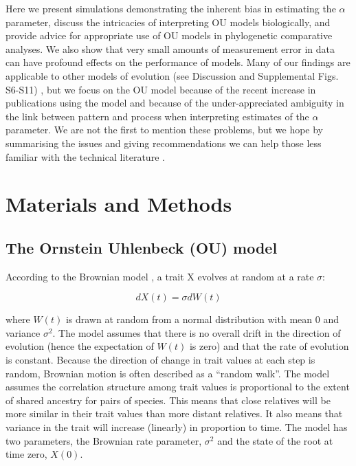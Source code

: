 \documentclass[a4paper,12pt]{article}
\begin{document}
  Here we present simulations demonstrating the inherent bias in estimating the $\alpha$ parameter, discuss the intricacies of interpreting OU models biologically, and provide advice for appropriate use of OU models in phylogenetic comparative analyses. We also show that very small amounts of measurement error in data can have profound effects on the performance of models. 
  Many of our findings are applicable to other models of evolution (see Discussion and Supplemental Figs. S6-S11) 
  , but we focus on the OU model because of the recent increase in publications using the model and because of the under-appreciated ambiguity in the link between pattern and process when interpreting estimates of the $\alpha$ parameter. 
  We are not the first to mention these problems, but we hope by summarising the issues and giving recommendations we can help those less familiar with the technical literature \citep[e.g.,][]{ho2013asymptotic,ho2014intrinsic,boettiger2012your,hansen2012interpreting,ives2010phylogenetic}.

\section{Materials and Methods}
  \subsection{The Ornstein Uhlenbeck (OU) model}
    According to the Brownian model \citep{cavalli1967,felsenstein1973maximum}, a trait X evolves at random at a rate $\sigma$:

      \begin{equation}
        dX(t) = \sigma dW(t)
      \end{equation}
    
    \noindent
    where $W(t)$ is drawn at random from a normal distribution with mean $0$ and variance $\sigma^2$. 
    The model assumes that there is no overall drift in the direction of evolution (hence the expectation of $W(t)$ is zero) and that the rate of evolution is constant. 
    Because the direction of change in trait values at each step is random, Brownian motion is often described as a ``random walk''.
    The model assumes the correlation structure among trait values is proportional to the extent of shared ancestry for pairs of species. 
    This means that close relatives will be more similar in their trait values than more distant relatives. It also means that variance in the trait will increase (linearly) in proportion to time. 
    The model has two parameters, the Brownian rate parameter, $\sigma^2$ and the state of the root at time zero, $X(0)$. 
\end{document}
